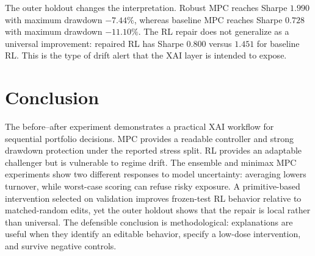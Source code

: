\documentclass[11pt,a4paper]{article}
\begin{document}
The outer holdout changes the interpretation. Robust MPC reaches Sharpe $1.990$ with maximum drawdown $-7.44\%$, whereas baseline MPC reaches Sharpe $0.728$ with maximum drawdown $-11.10\%$. The RL repair does not generalize as a universal improvement: repaired RL has Sharpe $0.800$ versus $1.451$ for baseline RL. This is the type of drift alert that the XAI layer is intended to expose.

\section{Conclusion}
The before--after experiment demonstrates a practical XAI workflow for sequential portfolio decisions. MPC provides a readable controller and strong drawdown protection under the reported stress split. RL provides an adaptable challenger but is vulnerable to regime drift. The ensemble and minimax MPC experiments show two different responses to model uncertainty: averaging lowers turnover, while worst-case scoring can refuse risky exposure. A primitive-based intervention selected on validation improves frozen-test RL behavior relative to matched-random edits, yet the outer holdout shows that the repair is local rather than universal. The defensible conclusion is methodological: explanations are useful when they identify an editable behavior, specify a low-dose intervention, and survive negative controls.
\end{document}
